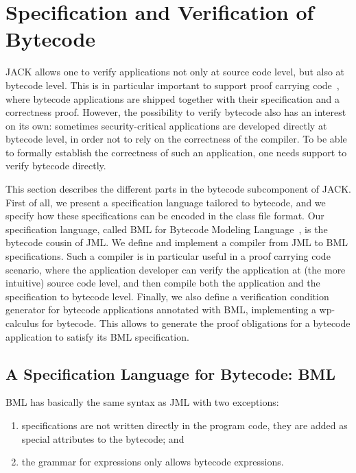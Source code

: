 \section{Specification and Verification of Bytecode}\label{SecBytecode}

JACK allows one to verify applications not only at source code level,
but also at bytecode level. This is in particular important to support
proof carrying code~\cite{Necula97}, where bytecode applications are
shipped together with their specification and a correctness
proof. However, the possibility to verify bytecode also has an
interest on its own: sometimes security-critical applications are
developed directly at bytecode level, in order not to rely on the
correctness of the compiler. To be able to formally establish the
correctness of such an application, one needs support to verify
bytecode directly.

This section describes the different parts in the bytecode
subcomponent of JACK. First of all, we present a specification
language tailored to bytecode, and we specify how these specifications
can be encoded in the class file format. Our specification language,
called BML for Bytecode Modeling Language~\cite{BurdyHP07}, is the
bytecode cousin of JML. We define and implement a compiler from JML to
BML specifications. Such a compiler is in particular useful in a proof
carrying code scenario, where the application developer can verify the
application at (the more intuitive) source code level, and then
compile both the application and the specification to bytecode
level. Finally, we also define a verification condition generator for
bytecode applications annotated with BML, implementing a wp-calculus
for bytecode. This allows to generate the proof obligations for a
bytecode application to satisfy its BML specification.

\subsection{A Specification Language for Bytecode: BML}

BML has basically the same syntax as JML with two exceptions:
\begin{enumerate}
\item specifications are not written directly in the program code,
they are added as special attributes to the bytecode; and
\item the grammar for expressions only allows bytecode expressions.
\end{enumerate}

